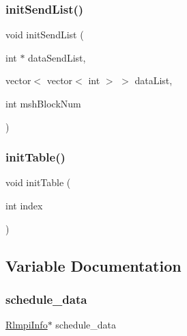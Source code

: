 \subsubsection{\texorpdfstring{initSendList()}{initSendList()}\hspace{0.1cm}{\footnotesize\ttfamily [2/2]}}
{\footnotesize\ttfamily void init\+Send\+List (\begin{DoxyParamCaption}\item[{int $\ast$}]{data\+Send\+List,  }\item[{vector$<$ vector$<$ int $>$ $>$}]{data\+List,  }\item[{int}]{msh\+Block\+Num }\end{DoxyParamCaption})}

\mbox{\label{include_2register_8H_a14fad51cfceca5a582218c98bdb3d769}} 
\subsubsection{\texorpdfstring{initTable()}{initTable()}}
{\footnotesize\ttfamily void init\+Table (\begin{DoxyParamCaption}\item[{int}]{index }\end{DoxyParamCaption})}



\subsection{Variable Documentation}
\mbox{\label{include_2register_8H_a67febbff53bf6fe81c504cad6803fca8}} 
\subsubsection{\texorpdfstring{schedule\_data}{schedule\_data}}
{\footnotesize\ttfamily \mbox{\hyperlink{structRlmpiInfo}{Rlmpi\+Info}}$\ast$ schedule\+\_\+data}

